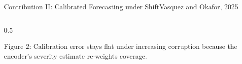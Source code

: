 \begin{frame}{Contribution II: Calibrated Forecasting under Shift}{Vasquez and Okafor, 2025}
\begin{columns}[T]
\begin{column}{0.5\textwidth}
      \par\vspace{0.1cm}
      {\scriptsize\textcolor{colorMuted}{Figure 2: Calibration error stays flat under
      increasing corruption because the encoder's severity estimate re-weights coverage.}}
    \end{column}
  \end{columns}
\end{frame}
